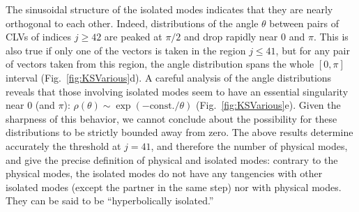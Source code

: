 \documentclass[prl,twocolumn,twoside,showpacs,superscriptaddress]{revtex4}
\begin{document}
The sinusoidal structure of the isolated modes indicates
 that they are nearly orthogonal to each other.
Indeed, distributions of the angle $\theta$
 between pairs of CLVs of indices $j \geq 42$ 
are peaked at $\pi/2$
 and drop rapidly near $0$ and $\pi$.
This is also true if only one of the vectors is taken in the region
 $j \leq 41$, but for any pair of vectors taken from this region,
the angle distribution spans the whole $[0,\pi]$ interval
(Fig.\ \ref{fig:KSVarious}d). 
A careful analysis of the angle distributions reveals that
 those involving isolated modes seem to have an essential singularity
near $0$ (and $\pi$): $\rho(\theta) \sim \exp(-\text{const.}/\theta)$
(Fig.\ \ref{fig:KSVarious}e). Given the sharpness of this behavior,
we cannot conclude about the possibility for these distributions to be 
strictly bounded away from zero.
The above results determine accurately the threshold at $j = 41$, 
and therefore the number of physical modes,
and give the precise definition of 
 physical and isolated modes:
 contrary to the physical modes, 
 the isolated modes do not have any tangencies
 with other isolated modes
 (except the partner in the same step) nor with physical modes.
They can be said to be ``hyperbolically isolated.''
%
\end{document}
